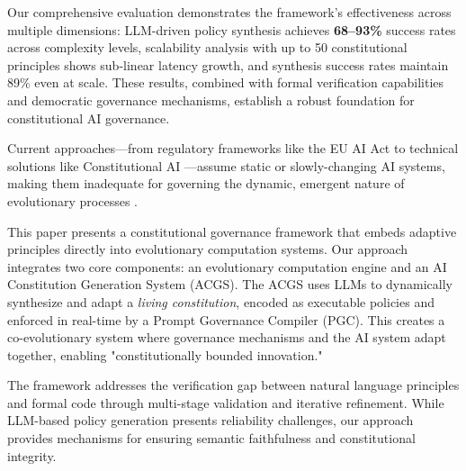 \documentclass[sigconf,natbib]{acmart}
\begin{document}
Our comprehensive evaluation demonstrates the framework's effectiveness across multiple dimensions: LLM-driven policy synthesis achieves \textbf{68--93\%} success rates across complexity levels, scalability analysis with up to 50 constitutional principles shows sub-linear latency growth, and synthesis success rates maintain 89\% even at scale. These results, combined with formal verification capabilities and democratic governance mechanisms, establish a robust foundation for constitutional AI governance.

Current approaches---from regulatory frameworks like the EU AI Act to technical solutions like Constitutional AI \cite{Bai2025ConstitutionalAI}---assume static or slowly-changing AI systems, making them inadequate for governing the dynamic, emergent nature of evolutionary processes \cite{StanfordJBLP2024AIGovernanceWeb3, StanfordLaw2025BulletProof}.

This paper presents a constitutional governance framework that embeds adaptive principles directly into evolutionary computation systems. Our approach integrates two core components: an evolutionary computation engine and an AI Constitution Generation System (ACGS). The ACGS uses LLMs to dynamically synthesize and adapt a \textit{living constitution}, encoded as executable policies and enforced in real-time by a Prompt Governance Compiler (PGC). This creates a co-evolutionary system where governance mechanisms and the AI system adapt together, enabling "constitutionally bounded innovation."

The framework addresses the verification gap between natural language principles and formal code through multi-stage validation and iterative refinement. While LLM-based policy generation presents reliability challenges, our approach provides mechanisms for ensuring semantic faithfulness and constitutional integrity.
\end{document}
